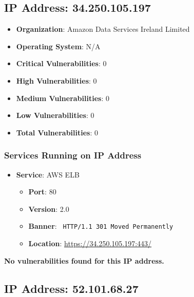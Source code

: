 \documentclass{article}
\begin{document}
\clearpage



\subsection*{IP Address: 34.250.105.197}

\begin{itemize}
    \item \textbf{Organization}: Amazon Data Services Ireland Limited
    \item \textbf{Operating System}:  N/A 
    \item \textbf{Critical Vulnerabilities}: 0
    \item \textbf{High Vulnerabilities}: 0
    \item \textbf{Medium Vulnerabilities}: 0
    \item \textbf{Low Vulnerabilities}: 0
    \item \textbf{Total Vulnerabilities}: 0
\end{itemize}

\subsubsection*{Services Running on IP Address}

\begin{itemize}
    
        \item \textbf{Service}: AWS ELB
        \begin{itemize}
            \item \textbf{Port}: 80
            \item \textbf{Version}:  2.0 
            \item \textbf{Banner}: \texttt{
                HTTP/1.1 301 Moved Permanently
            }
            \item \textbf{Location}: \href{ https://34.250.105.197:443/ }{ https://34.250.105.197:443/ }
        \end{itemize}
    
\end{itemize}


\textbf{No vulnerabilities found for this IP address.}




\clearpage



\subsection*{IP Address: 52.101.68.27}
\end{document}
